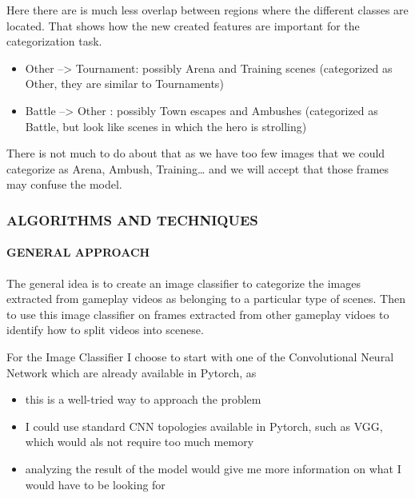 \documentclass[
]{article}
\providecommand{\tightlist}{%
  \setlength{\itemsep}{0pt}\setlength{\parskip}{0pt}}
\begin{document}
Here there are is much less overlap between regions where the different
classes are located. That shows how the new created features are
important for the categorization task.

\begin{itemize}
\tightlist
\item
  Other --\textgreater{} Tournament: possibly Arena and Training scenes
  (categorized as Other, they are similar to Tournaments)
\item
  Battle --\textgreater{} Other : possibly Town escapes and Ambushes
  (categorized as Battle, but look like scenes in which the hero is
  strolling)
\end{itemize}

There is not much to do about that as we have too few images that we
could categorize as Arena, Ambush, Training\ldots{} and we will accept
that those frames may confuse the model.

\hypertarget{algorithms-and-techniques}{%
\subsubsection{ALGORITHMS AND
TECHNIQUES}\label{algorithms-and-techniques}}

\hypertarget{general-approach}{%
\paragraph{GENERAL APPROACH}\label{general-approach}}

The general idea is to create an image classifier to categorize the
images extracted from gameplay videos as belonging to a particular type
of scenes. Then to use this image classifier on frames extracted from
other gameplay vidoes to identify how to split videos into scenese.

For the Image Classifier I choose to start with one of the Convolutional
Neural Network which are already available in Pytorch, as

\begin{itemize}
\tightlist
\item
  this is a well-tried way to approach the problem
\item
  I could use standard CNN topologies available in Pytorch, such as VGG,
  which would als not require too much memory
\item
  analyzing the result of the model would give me more information on
  what I would have to be looking for
\end{itemize}
\end{document}
